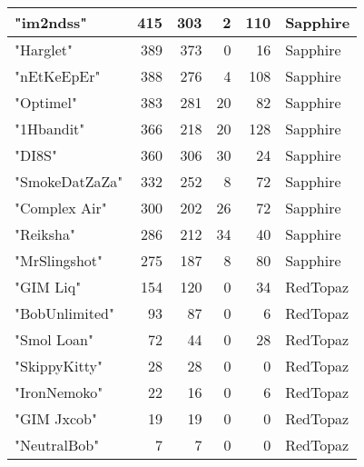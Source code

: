 \documentclass{article}
\begin{document}
\begin{table}[htbp]
\begin{tabular}{|l|r|r|r|r|l|}
"im2ndss" & 415 & 303 & 2 & 110 & Sapphire \\ \hline
"Harglet" & 389 & 373 & 0 & 16 & Sapphire \\ \hline
"nEtKeEpEr" & 388 & 276 & 4 & 108 & Sapphire \\ \hline
"Optimel" & 383 & 281 & 20 & 82 & Sapphire \\ \hline
"1Hbandit" & 366 & 218 & 20 & 128 & Sapphire \\ \hline
"DI8S" & 360 & 306 & 30 & 24 & Sapphire \\ \hline
"SmokeDatZaZa" & 332 & 252 & 8 & 72 & Sapphire \\ \hline
"Complex Air" & 300 & 202 & 26 & 72 & Sapphire \\ \hline
"Reiksha" & 286 & 212 & 34 & 40 & Sapphire \\ \hline
"MrSlingshot" & 275 & 187 & 8 & 80 & Sapphire \\ \hline
"GIM Liq" & 154 & 120 & 0 & 34 & RedTopaz \\ \hline
"BobUnlimited" & 93 & 87 & 0 & 6 & RedTopaz \\ \hline
"Smol Loan" & 72 & 44 & 0 & 28 & RedTopaz \\ \hline
"SkippyKitty" & 28 & 28 & 0 & 0 & RedTopaz \\ \hline
"IronNemoko" & 22 & 16 & 0 & 6 & RedTopaz \\ \hline
"GIM Jxcob" & 19 & 19 & 0 & 0 & RedTopaz \\ \hline
"NeutralBob" & 7 & 7 & 0 & 0 & RedTopaz \\ \hline
\end{tabular}
\end{table}
\end{document}
